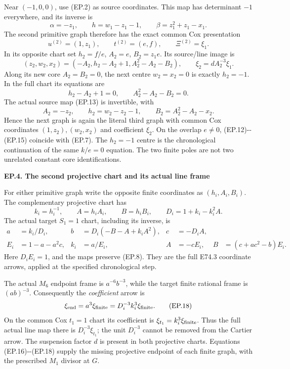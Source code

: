 Near \((-1,0,0)\), use (EP.2) as source coordinates. This map
has determinant \(-1\) everywhere, and its inverse is
\[
 \alpha=-z_1,\qquad h=w_1-z_1-1,\qquad
 \beta=z_1^2+z_1-x_1 .
 \tag{EP.11}
\]
The second primitive graph therefore has the exact common Cox
presentation
\[
 u^{(2)}=(1,z_1),\qquad t^{(2)}=(e,f),\qquad
 \Xi^{(2)}=\xi_1 .
 \tag{EP.12}
\]
In its opposite chart set \(h_2=f/e\), \(A_2=e\),
\(B_2=z_1e\). Its source/line image is
\[
 (z_2,w_2,x_2)
   =(-A_2,h_2-A_2+1,A_2^2-A_2-B_2),\qquad
 \xi_2=dA_2^{-3}\xi_1 .
 \tag{EP.13}
\]
Along its new core \(A_2=B_2=0\), the next centre
\(w_2=x_2=0\) is exactly \(h_2=-1\). In the full chart
its equations are
\[
 h_2-A_2+1=0,\qquad A_2^2-A_2-B_2=0 .
 \tag{EP.14}
\]
The actual source map (EP.13) is invertible, with
\[
 A_2=-z_2,\qquad h_2=w_2-z_2-1,\qquad
 B_2=A_2^2-A_2-x_2 .
 \tag{EP.15}
\]
Hence the next graph is again the literal third graph with
common Cox coordinates \((1,z_2),(w_2,x_2)\) and coefficient
\(\xi_2\). On the overlap \(e\ne0\), (EP.12)-\/-(EP.15) coincide
with (EP.7). The \(h_2=-1\) centre is the chronological
continuation of the same \(k/e=0\) equation. The two finite
poles are not two unrelated constant core identifications.

\par

\medskip\noindent\textbf{EP.4. The second projective chart and its actual line frame}

\par\nobreak

For either primitive graph write the opposite finite coordinates
as \((h_i,A_i,B_i)\). The complementary projective chart has
\[
 k_i=h_i^{-1},\qquad A=h_iA_i,\qquad B=h_iB_i,\qquad
 D_i=1+k_i-k_i^2A .
 \tag{EP.16}
\]
The actual target \(S_1=1\) chart, including its inverse, is
\[
 \begin{aligned}
 a&=k_i/D_i,& b&=D_i(-B-A+k_iA^2),& c&=-D_iA,\\
 E_i&=1-a-a^2c,&
 k_i&=a/E_i,& A&=-cE_i,& B&=(c+ac^2-b)E_i .
 \end{aligned}
 \tag{EP.17}
\]
Here \(D_iE_i=1\), and the maps preserve (EP.8).
They are the full E74.3 coordinate arrows, applied at the
specified chronological step.

The actual \(M_6\) endpoint frame is
\(a^{-6}b^{-3}\), while the target finite rational frame is
\((ab)^{-3}\). Consequently the \emph{coefficient} arrow is
\[
 \xi_{\rm end}=a^3\xi_{\rm finite}
              =D_i^{-3}k_i^3\xi_{\rm finite}.
 \tag{EP.18}
\]
On the common Cox \(t_1=1\) chart its coefficient is
\(\xi_{t_1}=k_i^3\xi_{\rm finite}\). Thus the full actual
line map there is \(D_i^{-3}\xi_{t_1}\); the unit \(D_i^{-3}\)
cannot be removed from the Cartier arrow. The suspension
factor \(d\) is present in both projective charts. Equations
(EP.16)-\/-(EP.18) supply the missing projective endpoint of
each finite graph, with the prescribed \(M_1\) divisor at \(G\).

